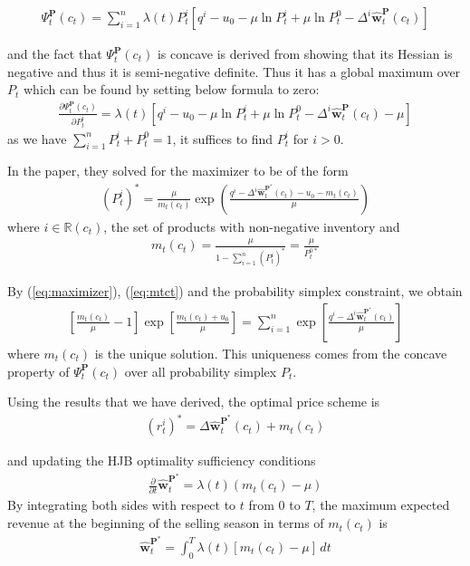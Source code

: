 \begin{align*}
\Psi_t^{\mathbf{P}}(c_t) = \sum_{i=1}^{n}\lambda(t) P_t^i\left[q^i - u_0 - \mu \ln P_t^i + \mu \ln P_t^0 - \Delta^i\hat{\mathbf{w}}_t^{\mathbf{P}}(c_t)\right]
\end{align*}

and the fact that $\Psi_t^{\mathbf{P}}(c_t)$ is concave is derived from showing that its Hessian is negative and thus it is semi-negative definite. Thus it has a global maximum over $P_t$ which can be found by setting below formula to zero:
\begin{align}
\frac{\partial \Psi_t^{\mathbf{P}}(c_t)}{\partial P_t^i} = \lambda(t) \left[q^i - u_0 - \mu \ln P_t^i + \mu \ln P_t^0 - \Delta^i \hat{\mathbf{w}}_t^{\mathbf{P}}(c_t)-\mu\right]
\end{align}
as we have $\sum_{i=1}^{n}P_t^i + P_t^0 = 1$, it suffices to find $P_t^i$ for $i>0$. 

In the paper, they solved for the maximizer to be of the form
\begin{align}
(P_t^i)^\ast = \frac{\mu}{m_t(c_t)}\exp \left(\frac{q^i-\Delta^i \hat{\mathbf{w}}_t^{\mathbf{P}^\ast}(c_t)-u_0 - m_t(c_t)}{\mu}\right)\label{eq:maximizer}
\end{align}
where $i \in \mathbb{R}(c_t)$, the set of products with non-negative inventory and 
\begin{align}
m_t(c_t) = \frac{\mu}{1 - \sum_{i=1}^{n}(P_t^i)^\ast} = \frac{\mu}{P_t^{0\ast}}\label{eq:mtct}
\end{align}

By (\ref{eq:maximizer}), (\ref{eq:mtct}) and the probability simplex constraint, we obtain
\begin{align}
\left[\frac{m_t(c_t)}{\mu}-1\right] \exp \left[\frac{m_t(c_t)+u_0}{\mu}\right] = \sum_{i=1}^{n}\exp \left[\frac{q^i-\Delta^i \hat{\mathbf{w}}_t^{\mathbf{P}^\ast}(c_t)}{\mu}\right]\label{eq:uniquesol}
\end{align}
where $m_t(c_t)$ is the unique solution. This uniqueness comes from the concave property of $\Psi_t^{\mathbf{P}}(c_t)$ over all probability simplex $P_t$.

Using the results that we have derived, the optimal price scheme is
\begin{align}
(r_t^i)^\ast = \Delta \hat{\mathbf{w}}_t^{\mathbf{P}^\ast}(c_t)+m_t(c_t)\label{eq:optpricescheme}
\end{align}

and updating the HJB optimality sufficiency conditions
\begin{align}
\frac{\partial}{\partial t}\hat{\mathbf{w}}_t^{\mathbf{P}^\ast} = \lambda(t)(m_t(c_t) - \mu)\label{eq:pdw}
\end{align}
By integrating both sides with respect to $t$ from $0$ to $T$,  the maximum expected revenue at the beginning of the selling season in terms of $m_t(c_t)$ is 
\begin{align}
\hat{\mathbf{w}}_t^{\mathbf{P}^\ast} = \int_{0}^{T}\lambda(t)\left[m_t(c_t)-\mu\right]\,dt
\end{align}

